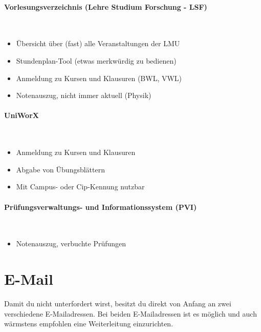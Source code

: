 \paragraph{Vorlesungsverzeichnis (Lehre Studium Forschung - LSF)}\hfill\\
\begin{itemize}
	\item Übersicht über (fast) alle Veranstaltungen der LMU
	\item Stundenplan-Tool (etwas merkwürdig zu bedienen)
	\item Anmeldung zu Kursen und Klausuren (BWL, VWL)
        \item Notenauszug, nicht immer aktuell (Physik)
\end{itemize}
\begin{urlList}
\end{urlList}

\paragraph{UniWorX}\subjectList{\subjectMI{}\subjectI{}}\hfill\\
\begin{itemize}
	\item Anmeldung zu Kursen und Klausuren
	\item Abgabe von Übungsblättern
	\item Mit Campus- oder Cip-Kennung nutzbar
\end{itemize}
\begin{urlList}
\end{urlList}

\paragraph{Prüfungsverwaltungs- und Informationssystem (PVI)}\subjectList{\subjectMI{}\subjectI{}}\hfill\\
\begin{itemize}
	\item Notenauszug, verbuchte Prüfungen
\end{itemize}
\begin{urlList}
\end{urlList}

\section{E-Mail}
Damit du nicht unterfordert wirst, besitzt du direkt von Anfang an zwei verschiedene E-Mailadressen. Bei beiden E-Mailadressen ist es möglich und auch wärmstens empfohlen eine Weiterleitung einzurichten.\\

